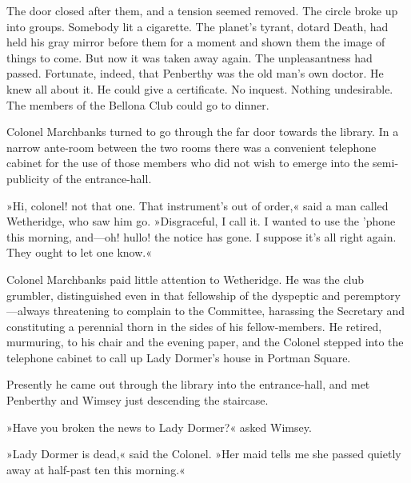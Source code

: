 The door closed after them, and a tension seemed removed. The circle broke up into groups. Somebody lit a cigarette. The planet's tyrant, dotard Death, had held his gray mirror before them for a moment and shown them the image of things to come. But now it was taken away again. The unpleasantness had passed. Fortunate, indeed, that Penberthy was the old man's own doctor. He knew all about it. He could give a certificate. No inquest. Nothing undesirable. The members of the Bellona Club could go to dinner.

Colonel Marchbanks turned to go through the far door towards the library. In a narrow ante-room between the two rooms there was a convenient telephone cabinet for the use of those members who did not wish to emerge into the semi-publicity of the entrance-hall.

»Hi, colonel! not that one. That instrument's out of order,« said a man called Wetheridge, who saw him go. »Disgraceful, I call it. I wanted to use the 'phone this morning, and—oh! hullo! the notice has gone. I suppose it's all right again. They ought to let one know.«

Colonel Marchbanks paid little attention to Wetheridge. He was the club grumbler, distinguished even in that fellowship of the dyspeptic and peremptory—always threatening to complain to the Committee, harassing the Secretary and constituting a perennial thorn in the sides of his fellow-members. He retired, murmuring, to his chair and the evening paper, and the Colonel stepped into the telephone cabinet to call up Lady Dormer's house in Portman Square.

Presently he came out through the library into the entrance-hall, and met Penberthy and Wimsey just descending the staircase.

»Have you broken the news to Lady Dormer?« asked Wimsey.

»Lady Dormer is dead,« said the Colonel. »Her maid tells me she passed quietly away at half-past ten this morning.«